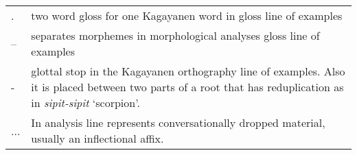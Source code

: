 \noindent
\begin{tabularx} {\textwidth}{lQ}
{}.       & two word gloss for one Kagayanen word in gloss line of examples \\
--       & separates morphemes in morphological analyses gloss line of examples \\
-       & glottal stop in the Kagayanen orthography line of examples. Also it is placed between two parts of a root that has reduplication as in \textit{sipit-sipit} ‘scorpion’. \\
...       & In analysis line represents conversationally dropped material, usually an inflectional affix. \\
\end{tabularx}
